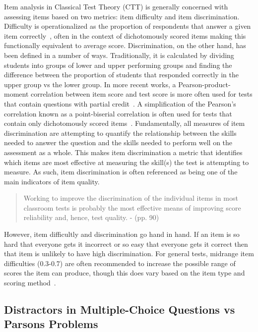\documentclass[]{acmart}
\begin{document}
Item analysis in Classical Test Theory (CTT) is generally concerned with
assessing items based on two metrics: item difficulty and item discrimination.
Difficulty is operationalized as the proportion of respondents that answer a
given item correctly~\cite{engelhart1965comparison, brennan1972generalized},
often in the context of dichotomously scored items making this functionally
equivalent to average score.  Discrimination, on the other hand, has been
defined in a number of ways.  Traditionally, it is calculated by dividing
students into groups of lower and upper performing groups and finding the difference
between
the proportion of students that responded correctly in the upper group vs the
lower group. In more recent works, a Pearson-product-moment correlation between
item score and test score is more often used for tests that contain questions
with partial credit~\cite{setiawan2014simulation}. A simplification of the
Pearson's correlation known as a point-biserial correlation is often used for
tests that contain only dichotomously scored items~\cite{kornbrot2014point}.
Fundamentally, all measures of item discrimination are attempting to quantify
the relationship between the skills needed to answer the question and the skills
needed to perform well on the assessment as a whole. This makes item discrimination a
metric that identifies which items are most effective at measuring the skill(s)
the test is attempting to measure.  As such, item discrimination is often
referenced as being one of the main indicators of item quality. 
\begin{quote}
    Working to improve the discrimination of the individual items in most
    classroom tests is probably the most effective means of improving score
    reliability and, hence, test quality. - \citet{ebel1972essentials} (pp. 90)
\end{quote}
However, item difficultly and discrimination go hand in hand. If an item is
so hard that everyone gets it incorrect or so easy that everyone gets it correct then that item is unlikely to have high discrimination. For general tests, midrange item difficulties (0.3-0.7)
are often recommended to increase the possible range of scores the item can
produce, though this does vary based on the item type and scoring
method~\cite{lord1953application, ebel1972essentials, hotiu2006relationship}.


\subsection{Distractors in Multiple-Choice Questions vs Parsons Problems}
\end{document}
